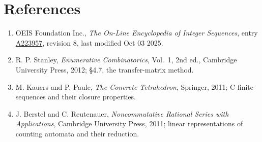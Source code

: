 \documentclass[11pt]{article}
\theoremstyle{definition}
\begin{document}
\section{References}

\begin{enumerate}

\item OEIS Foundation Inc., \emph{The On-Line Encyclopedia of Integer Sequences}, entry \href{https://oeis.org/A223957}{A223957}, revision 8, last modified Oct 03 2025.

\item R. P. Stanley, \emph{Enumerative Combinatorics}, Vol.~1, 2nd ed., Cambridge University Press, 2012; \S4.7, the transfer-matrix method.

\item M. Kauers and P. Paule, \emph{The Concrete Tetrahedron}, Springer, 2011; C-finite sequences and their closure properties.

\item J. Berstel and C. Reutenauer, \emph{Noncommutative Rational Series with Applications}, Cambridge University Press, 2011; linear representations of counting automata and their reduction.

\end{enumerate}
\end{document}
